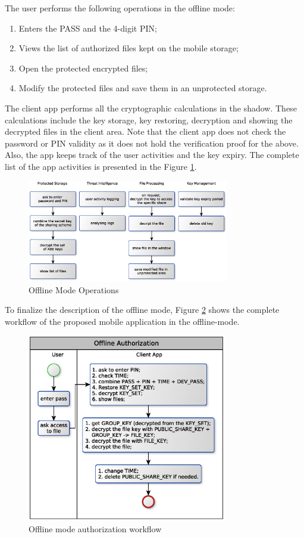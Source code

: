 \documentclass[twocolumn]{svjour3}          %
\begin{document}
The user performs the following operations in the offline mode:

\begin{enumerate}
	\item Enters the PASS and the 4-digit PIN;
	\item Views the list of authorized files kept on the mobile storage;
	\item Open the protected encrypted files;
	\item Modify the protected files and save them in an unprotected storage.
\end{enumerate}

The client app performs all the cryptographic calculations in the shadow. These calculations include the key storage, key restoring, decryption and showing the decrypted files in the client area. Note that the client app does not check the password or PIN validity as it does not hold the verification proof for the above. Also, the app keeps track of the user activities and the key expiry. The complete list of the app activities is presented in the Figure \ref{fig:6}.

\begin{figure}[h!]
	\centering
	\includegraphics[width=8.8cm]{figures/offlinemodeoperationss.eps}
	\caption{Offline Mode Operations}
	\label{fig:6}
\end{figure}

To finalize the description of the offline mode, Figure \ref{fig:7} shows the complete workflow of the proposed mobile application in the offline-mode.

\begin{figure}[h!]
	\centering
	\includegraphics[width=8.7cm]{figures/OfflineAuthorizationWorkflow.eps}
	\caption{Offline mode authorization workflow}
	\label{fig:7}
\end{figure}
\end{document}

